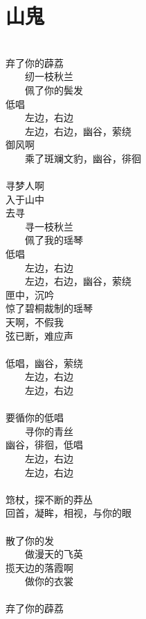 \chapter[山鬼]{山\qquad 鬼}

\leftskip=25mm
\noindent \\
弃了你的薜荔 \\
　　纫一枝秋兰 \\
　　佩了你的鬓发　\\
低唱 \\
　　左边，右边 \\
　　左边，右边，幽谷，萦绕 \\
御风啊 \\
　　乘了斑斓文豹，幽谷，徘徊 \\
\\
寻梦人啊 \\
入于山中 \\
去寻 \\
　　寻一枝秋兰 \\
　　佩了我的瑶琴 \\
低唱 \\
　　左边，右边 \\
　　左边，右边，幽谷，萦绕 \\
匣中，沉吟 \\
惊了碧桐裁制的瑶琴 \\
天啊，不假我 \\
弦已断，难应声 \\
\\
低唱，幽谷，萦绕 \\
　　左边，右边 \\
　　左边，右边 \\
\\
要循你的低唱 \\
　　寻你的青丝 \\
幽谷，徘徊，低唱 \\
　　左边，右边 \\
　　左边，右边 \\
\\
筇杖，探不断的莽丛 \\
回首，凝眸，相视，与你的眼 \\
\\
散了你的发 \\
　　做漫天的飞英 \\
揽天边的落霞啊 \\
　　做你的衣裳 \\
\\
弃了你的薜荔 \\
